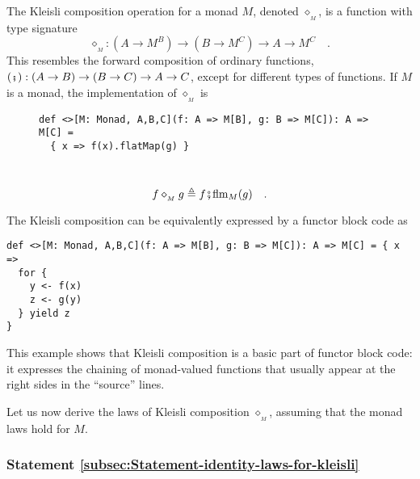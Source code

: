 The Kleisli composition operation for a monad $M$, denoted $\diamond_{_{M}}$,
is a function with type signature
\[
\diamond_{_{M}}:(A\rightarrow M^{B})\rightarrow(B\rightarrow M^{C})\rightarrow A\rightarrow M^{C}\quad.
\]
This resembles the forward composition of ordinary functions, $\left(\bef\right):\left(A\rightarrow B\right)\rightarrow\left(B\rightarrow C\right)\rightarrow A\rightarrow C$,
except for different types of functions. If $M$ is a monad, the implementation
of $\diamond_{_{M}}$ is

\begin{wrapfigure}{l}{0.64\columnwidth}%
\vspace{-0.8\baselineskip}
\begin{lstlisting}
def <>[M: Monad, A,B,C](f: A => M[B], g: B => M[C]): A => M[C] =
  { x => f(x).flatMap(g) }
\end{lstlisting}
\vspace{-0.9\baselineskip}
\end{wrapfigure}%

~\vspace{-0.8\baselineskip}
\begin{equation}
f\diamond_{_{M}}g\triangleq f\bef\text{flm}_{M}(g)\quad.\label{eq:def-of-kleisli-composition-for-monad-via-flatMap}
\end{equation}
\vspace{-0.2\baselineskip}

The Kleisli composition can be equivalently expressed by a functor
block code as

\begin{lstlisting}[mathescape=true]
def <>[M: Monad, A,B,C](f: A => M[B], g: B => M[C]): A => M[C] = { x =>
  for {
    y <- f(x)
    z <- g(y)
  } yield z
}
\end{lstlisting}

This example shows that Kleisli composition is a basic part of functor
block code: it expresses the chaining of monad-valued functions that
usually appear at the right sides in the \textsf{``}source\textsf{''} lines.

Let us now derive the laws of Kleisli composition $\diamond_{_{M}}$,
assuming that the monad laws hold for $M$. %
\begin{comment}
We begin with \lstinline!flatMap!\textsf{'}s identity laws.
\end{comment}


\subsubsection{Statement \label{subsec:Statement-identity-laws-for-kleisli}\ref{subsec:Statement-identity-laws-for-kleisli}}


